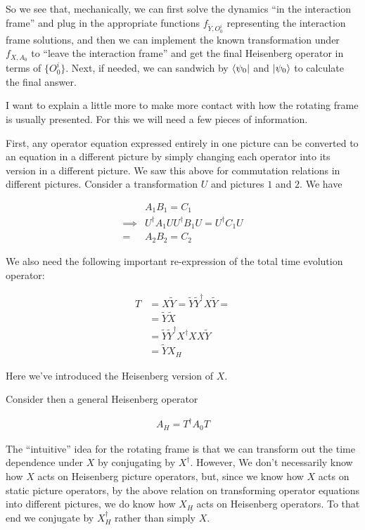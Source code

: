 \documentclass[12pt]{article}
\begin{document}
So we see that, mechanically, we can first solve the dynamics ``in the interaction frame'' and plug in the appropriate functions $f_{\tilde{Y},O_0^i}$ representing the interaction frame solutions, and then we can implement the known transformation under $f_{X,A_0}$ to ``leave the interaction frame'' and get the final Heisenberg operator in terms of $\{O_0^i\}$. Next, if needed, we can sandwich by $\bra{\psi_0}$ and $\ket{\psi_0}$ to calculate the final answer.

I want to explain a little more to make more contact with how the rotating frame is usually presented. For this we will need a few pieces of information.

First, any operator equation expressed entirely in one picture can be converted to an equation in a different picture by simply changing each operator into its version in a different picture. We saw this above for commutation relations in different pictures. Consider a transformation $U$ and pictures $1$ and $2$. We have

\begin{align}
&A_1 B_1 = C_1\\
\implies& U^{\dag}A_1 U U^{\dag} B_1 U = U^{\dag}C_1 U\\
=& A_2 B_2 = C_2
\end{align}

We also need the following important re-expression of the total time evolution operator:

\begin{align}
T &= X\tilde{Y} = \tilde{Y} \tilde{Y}^{\dag} X \tilde{Y} =\\
&= \tilde{Y}\tilde{X}\\
&= \tilde{Y} \tilde{Y}^{\dag} X^{\dag} X X \tilde{Y}\\
&= \tilde{Y} X_H
\end{align}

Here we've introduced the Heisenberg version of $X$.

Consider then a general Heisenberg operator 

\begin{align}
A_H = T^{\dag}A_0T
\end{align}

The ``intuitive'' idea for the rotating frame is that we can transform out the time dependence under $X$ by conjugating by $X^{\dag}$. However, We don't necessarily know how $X$ acts on Heisenberg picture operators, but, since we know how $X$ acts on static picture operators, by the above relation on transforming operator equations into different pictures, we do know how $X_H$ acts on Heisenberg operators. To that end we conjugate by $X_H^{\dag}$ rather than simply $X$.
\end{document}
